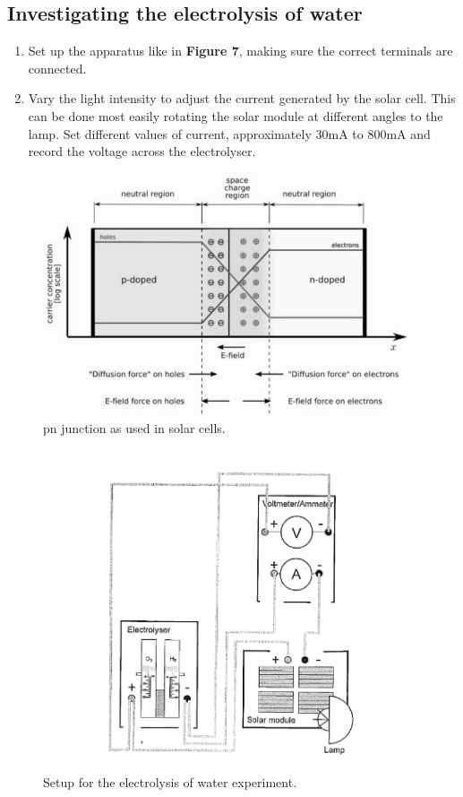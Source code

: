 \documentclass{article}
\begin{document}
    \subsection{Investigating the electrolysis of water}
    \begin{enumerate}
        \item Set up the apparatus like in \textbf{Figure 7}, making sure the correct terminals are connected.
        \item Vary the light intensity to adjust the current generated by the solar cell. This can be done most easily 
        rotating the solar module at different angles to the lamp. Set different values of current, approximately 30mA to 
        800mA and record the voltage across the electrolyser.
    \end{enumerate}
    \begin{figure}
        \centering
        \includegraphics[scale=0.4]{./pn.png}
        \caption{pn junction as used in solar cells. \cite{P:SE}}
    \end{figure}
    \begin{figure}
        \centering
        \includegraphics[scale=0.3]{./three.png}
        \caption{Setup for the electrolysis of water experiment. \cite{SCE}}
    \end{figure}
\end{document}
